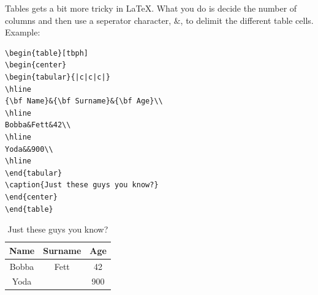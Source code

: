 Tables gets a bit more tricky in \LaTeX. What you do is decide the
number of columns and then use a seperator character, $\&$, to delimit
the different table cells. Example:
\begin{verbatim}
\begin{table}[tbph]
\begin{center}
\begin{tabular}{|c|c|c|}
\hline
{\bf Name}&{\bf Surname}&{\bf Age}\\
\hline
Bobba&Fett&42\\
\hline
Yoda&&900\\
\hline
\end{tabular}
\caption{Just these guys you know?}
\end{center}
\end{table}
\end{verbatim}

\begin{table}[tbph]
\begin{center}
\begin{tabular}{|c|c|c|}
\hline
{\bf Name}&{\bf Surname}&{\bf Age}\\
\hline
Bobba&Fett&42\\
\hline
Yoda&&900\\
\hline
\end{tabular}
\caption{Just these guys you know?}
\end{center}
\end{table}

